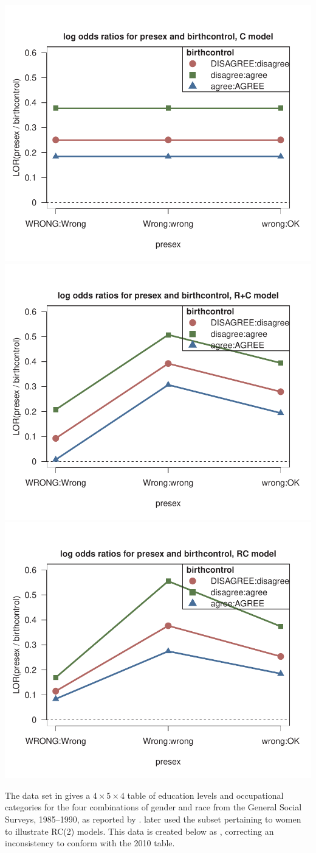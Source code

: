 \documentclass[10pt]{report}\usepackage[]{graphicx}\usepackage[]{color}
\newenvironment{knitrout}{}{} %
\renewenvironment{knitrout}{\small\renewcommand{\baselinestretch}{.85}}{} %
\begin{document}
\begin{Exercises}
\begin{enumerate*}
\begin{ans}
\begin{knitrout}
\centerline{\includegraphics[width=.32\textwidth]{soln/fig/ex10_3c-1} 
\includegraphics[width=.32\textwidth]{soln/fig/ex10_3c-2} 
\includegraphics[width=.32\textwidth]{soln/fig/ex10_3c-3} }



\end{knitrout}
    \end{ans}
     
  \end{enumerate*}
  
  
  \exercise The data set  in  gives a $4 \times 5 \times 4$
  table of education levels and occupational categories for the four combinations
  of gender and race from the General Social Surveys, 1985--1990, as reported by
  \citet[Table 2]{Wong:2001}. \citet[Table 2.3B]{Wong:2010} later used the
  subset pertaining to women to illustrate RC(2) models.  This data is
  created below as , correcting an inconsistency to conform with
  the 2010 table.
  


\end{Exercises}
\end{document}

